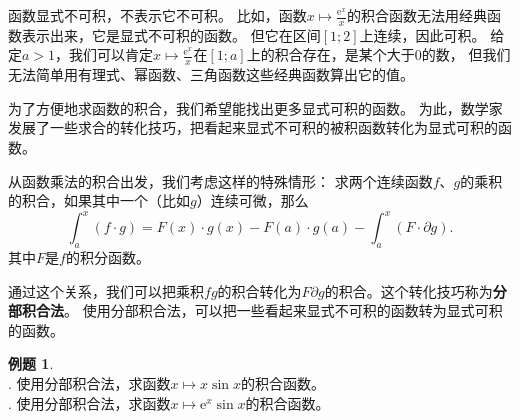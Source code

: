 \documentclass[12pt,UTF8]{ctexbook}
\theoremstyle{definition}
\newtheorem{et}{例题}[section]
\theoremstyle{plain}
\begin{document}
函数显式不可积，不表示它不可积。
比如，函数$x\mapsto \frac{\mathrm{e}^x}{x}$的积合函数无法用经典函数表示出来，它是显式不可积的函数。
但它在区间$[1;2]$上连续，因此可积。
给定$a>1$，我们可以肯定$x\mapsto \frac{\mathrm{e}^x}{x}$在$[1; a]$上的积合存在，是某个大于$0$的数，
但我们无法简单用有理式、幂函数、三角函数这些经典函数算出它的值。

为了方便地求函数的积合，我们希望能找出更多显式可积的函数。
为此，数学家发展了一些求合的转化技巧，把看起来显式不可积的被积函数转化为显式可积的函数。

从函数乘法的积合出发，我们考虑这样的特殊情形：
求两个连续函数$f$、$g$的乘积的积合，如果其中一个（比如$g$）连续可微，那么
$$ \int_a^x (f \cdot g) = F(x)\cdot g(x) - F(a)\cdot g(a) - \int_a^x (F \cdot \partial g). $$
其中$F$是$f$的积分函数。

通过这个关系，我们可以把乘积$fg$的积合转化为$F\partial g$的积合。这个转化技巧称为\textbf{分部积合法}。
使用分部积合法，可以把一些看起来显式不可积的函数转为显式可积的函数。

\begin{et}
    \mbox{} \\
    . 使用分部积合法，求函数$x\mapsto x \sin{x}$的积合函数。\\
    . 使用分部积合法，求函数$x\mapsto \mathrm{e}^x \sin{x}$的积合函数。\\
\end{et}
\end{document}
